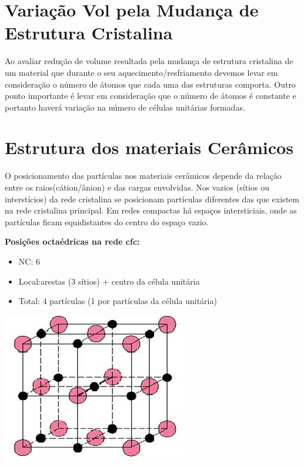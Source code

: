 \section{Variação Vol pela Mudança de Estrutura Cristalina}

Ao avaliar redução de volume resultada pela mudança de estrutura cristalina de um material que durante o seu aquecimento/resfriamento devemos levar em consideração o número de átomos que cada uma das estruturas comporta. Outro ponto importante é levar em consideração que o número de átomos é constante e portanto haverá variação na número de células unitárias formadas.


 \section{Estrutura dos materiais Cerâmicos}

O posicionamento das partículas nos materiais cerâmicos depende da relação entre os raios(cátion/ânion) e das cargas envolvidas. Nos vazios (sítios ou interstícios) da rede cristalina se posicionam partículas diferentes das que existem na rede cristalina principal. Em redes compactas há espaços intersticiais, onde as partículas ficam equidistantes do centro do espaço vazio.


\textbf{Posições octaédricas na rede cfc:}

\begin{itemize}
	
	\setlength{\parskip}{0pt}
	\setlength{\itemsep}{0pt plus 1pt}
	
	\item NC: 6
	\item Local:arestas (3 sítios) + centro da célula unitária
	\item Total: 4 partículas (1 por partículas da célula unitária)
\end{itemize}

\includegraphics[scale=0.5,trim={0 0 0 0}]{figures/occfc}


